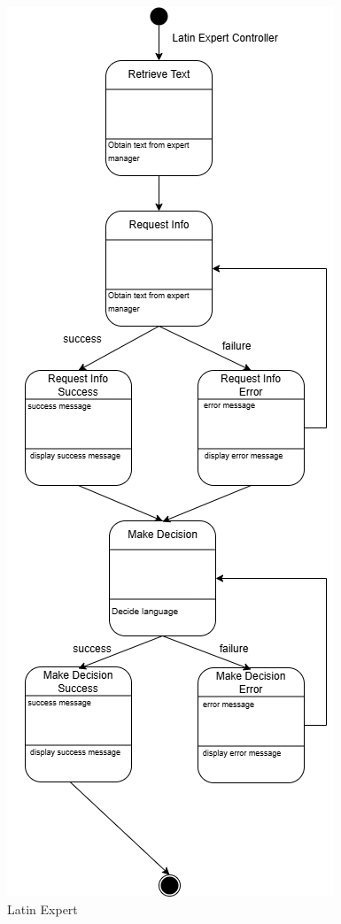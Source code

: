 \begin{figure}[H]
	\centering
	\includegraphics[width=\textwidth, height=\textheight, keepaspectratio]{Section2/images/latin_expert_state_diagram.png}
	\caption{Latin Expert}
	\label{LatinExpert}
\end{figure}